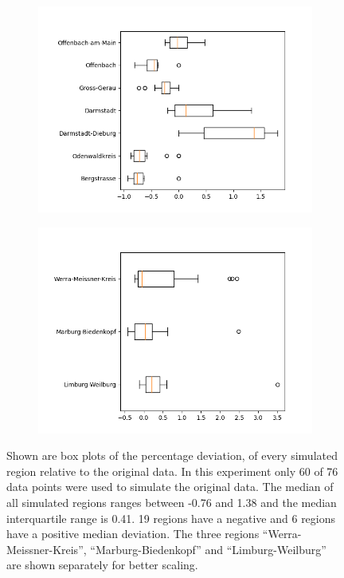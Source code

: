 \begin{figure}
\begin{subfigure}[b]{0.4\textwidth}
		\includegraphics[width=\textwidth]{./figures/60d/deviation_box60_alt3.png}	
	\end{subfigure}
	\begin{subfigure}[b]{0.4\textwidth}
		\centering
		\includegraphics[width=\textwidth]{./figures/60d/deviation_box60_alt4.png}	
	\end{subfigure}
	\caption{Shown are box plots of the percentage deviation, of every simulated region relative to the original data.
		In this experiment only 60 of 76 data points were used to simulate the original data. The median of all
		simulated regions ranges between -0.76 and 1.38 and the median interquartile range is 0.41. 19 regions
		have a negative and 6 regions have a positive median deviation. The three regions ``Werra-Meissner-Kreis'',
		``Marburg-Biedenkopf'' and ``Limburg-Weilburg'' are shown separately for better scaling.
		}
	\label{fig:60_sim_box}
\end{figure}

